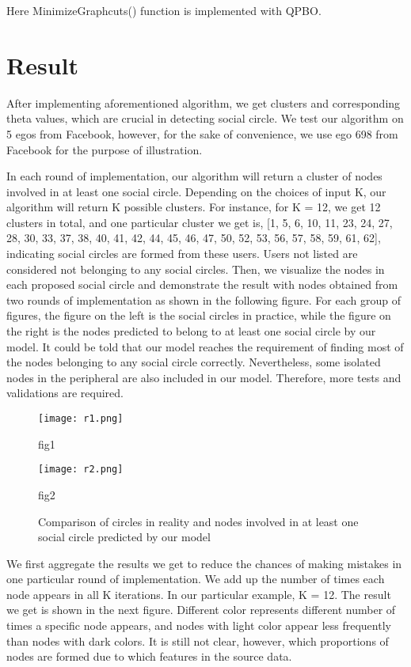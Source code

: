\documentclass[12pt,a4paper]{article}
\begin{document}
Here MinimizeGraphcuts() function is implemented with QPBO.

\newpage
\section*{Result}
\par After implementing aforementioned algorithm, we get clusters and corresponding theta values, which are crucial in detecting social circle. We test our algorithm on 5 egos from Facebook, however, for the sake of convenience, we use ego 698 from Facebook for the purpose of illustration. \\

\par 
In each round of implementation, our algorithm will return a cluster of nodes involved in at least one social circle. Depending on the choices of input K, our algorithm will return K possible clusters. For instance, for K = 12, we get 12 clusters in total, and one particular cluster we get is, [1, 5, 6, 10, 11, 23, 24, 27, 28, 30, 33, 37, 38, 40, 41, 42, 44, 45, 46, 47, 50, 52, 53, 56, 57, 58, 59, 61, 62], indicating social circles are formed from these users. Users not listed are considered not belonging to any social circles. Then, we visualize the nodes in each proposed social circle and demonstrate the result with nodes obtained from two rounds of implementation as shown in the following figure. For each group of figures, the figure on the left is the social circles in practice, while the figure on the right is the nodes predicted to belong to at least one social circle by our model. It could be told that our model reaches the requirement of finding most of the nodes belonging to any social circle correctly. Nevertheless, some isolated nodes in the peripheral are also included in our model. Therefore, more tests and validations are required.
\begin{figure}[H]
\begin{minipage}[t]{0.5\linewidth}
\centering
\texttt{[image: r1.png]}
\caption{fig1}
\label{fig:side:a}
\end{minipage}%
\begin{minipage}[t]{0.5\linewidth}
\centering
\texttt{[image: r2.png]}
\caption{fig2}
\label{fig:side:b}
\end{minipage}
\caption{Comparison of circles in reality and nodes involved in at least one social circle predicted by our model}
\end{figure}
\par
We first aggregate the results we get to reduce the chances of making mistakes in one particular round of implementation. We add up the number of times each node appears in all K iterations. In our particular example, K = 12. The result we get is shown in the next figure. Different color represents different number of times a specific node appears, and nodes with light color appear less frequently than nodes with dark colors. It is still not clear, however, which proportions of nodes are formed due to which features in the source data.
\end{document}
